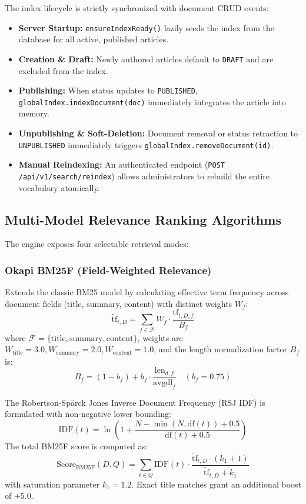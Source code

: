 \documentclass[conference]{IEEEtran}
\begin{document}
The index lifecycle is strictly synchronized with document CRUD events:
\begin{itemize}
    \item \textbf{Server Startup:} \texttt{ensureIndexReady()} lazily seeds the index from the database for all active, published articles.
    \item \textbf{Creation \& Draft:} Newly authored articles default to \texttt{DRAFT} and are excluded from the index.
    \item \textbf{Publishing:} When status updates to \texttt{PUBLISHED}, \texttt{globalIndex.indexDocument(doc)} immediately integrates the article into memory.
    \item \textbf{Unpublishing \& Soft-Deletion:} Document removal or status retraction to \texttt{UNPUBLISHED} immediately triggers \texttt{globalIndex.removeDocument(id)}.
    \item \textbf{Manual Reindexing:} An authenticated endpoint (\texttt{POST /api/v1/search/reindex}) allows administrators to rebuild the entire vocabulary atomically.
\end{itemize}

\subsection{Multi-Model Relevance Ranking Algorithms}
The engine exposes four selectable retrieval modes:

\subsubsection{Okapi BM25F (Field-Weighted Relevance)}
Extends the classic BM25 model by calculating effective term frequency across document fields (title, summary, content) with distinct weights $W_f$:
\begin{equation}
\tilde{\text{tf}}_{t,D} = \sum_{f \in \mathcal{F}} W_f \cdot \frac{\text{tf}_{t,D,f}}{B_f}
\end{equation}
where $\mathcal{F} = \{\text{title}, \text{summary}, \text{content}\}$, weights are $W_{\text{title}} = 3.0, W_{\text{summary}} = 2.0, W_{\text{content}} = 1.0$, and the length normalization factor $B_f$ is:
\begin{equation}
B_f = (1 - b_f) + b_f \cdot \frac{\text{len}_{d,f}}{\text{avgdl}_f} \quad (b_f = 0.75)
\end{equation}

The Robertson-Spärck Jones Inverse Document Frequency (RSJ IDF) is formulated with non-negative lower bounding:
\begin{equation}
\text{IDF}(t) = \ln\left(1 + \frac{N - \min(N, \text{df}(t)) + 0.5}{\text{df}(t) + 0.5}\right)
\end{equation}
The total BM25F score is computed as:
\begin{equation}
\text{Score}_{\text{BM25F}}(D, Q) = \sum_{t \in Q} \text{IDF}(t) \cdot \frac{\tilde{\text{tf}}_{t,D} \cdot (k_1 + 1)}{\tilde{\text{tf}}_{t,D} + k_1}
\end{equation}
with saturation parameter $k_1 = 1.2$. Exact title matches grant an additional boost of $+5.0$.
\end{document}
